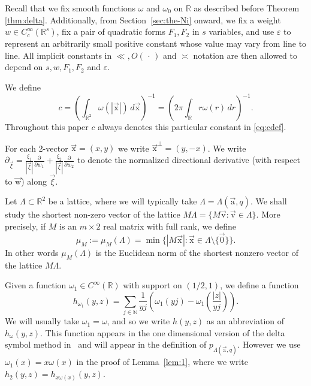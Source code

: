 \documentclass[letterpaper,11pt]{amsart}
\numberwithin{equation}{section}
\theoremstyle{definition}
\numberwithin{equation}{section}
\newcommand{\RR}{\mathbb{R}}
\newcommand{\ux}{{\vec{\mathrm{x}}}}
\newcommand{\ua}{\vec{\mathrm{a}}}
\newcommand{\uw}{{\vec{\mathrm{w}}}}
\newcommand{\uv}{{\vec{\mathrm{v}}}}
\newcommand{\ve}{\varepsilon}
\newcommand{\N}{\mathbb{N}}
\newcommand{\R}{\mathbb{R}}
\begin{document}
Recall that we fix smooth functions $\omega$ and $\omega_0$ on $\RR$ as described before Theorem \ref{thm:delta}.
 Additionally, from Section~\ref{sec:the-Ni} onward, we fix a weight \(w\in C_c^\infty(\mathbb R^s)\), fix a pair of quadratic forms \(F_1,F_2\) in \(s\) variables, and use \(\ve\) to represent an arbitrarily small positive constant whose value may vary from line to line. All implicit constants in \(\ll, O(\,\cdot\,)\) and \(\asymp\) notation are then allowed to depend on \(s,w,F_1,F_2\) and \(\ve\).   


We define
 \begin{equation}
 	\label{eq:cdef}
 	c = (\int_{\R^2} \omega(|\ux|)\,d\ux)^{-1}=(2\pi\int_\R r\omega(r)\,dr)^{-1}.
 \end{equation}
Throughout this paper \(c\) always denotes this particular constant in \eqref{eq:cdef}.


 For each 2-vector \(\ux=(x,y)\) we write \(\ux^\perp = (y,-x)\). We write \(\partial_{\vec{\xi}} = \frac{\xi_1}{|\vec\xi|}\frac{\partial}{\partial w_1}+ \frac{\xi_2}{|\vec\xi|}\frac{\partial}{\partial w_2}\) to denote the normalized directional derivative (with respect to $\uw$) along \(\vec{\xi}\).

 
 Let $\Lambda\subset \RR^2$ be a lattice, where  we  will   typically take \(\Lambda=\Lambda(\ua,q)\). We shall study the shortest non-zero vector of the lattice \(M\Lambda=\{M\uv:\uv\in \Lambda\}\). More precisely, if \(M\) is an \(m \times 2\) real matrix with full rank, we define
 \begin{equation*}
 	\mu_{M}:=\mu_M(\Lambda)=\min\{|M\ux|:\ux\in \Lambda\setminus\{\vec{0}\}\}.
 \end{equation*}
 In other words \(\mu_M(\Lambda)\) is the Euclidean norm of the shortest nonzero vector of the lattice \(M\Lambda\).
 

Given a function \(\omega_1\in C^\infty (\RR)\) with support on $(1/2,1)$, we define a function
\begin{equation}
	\label{eq:hyzdef}
	h_{\omega_1}(y,z)
	=
	\sum_{j\in\N}
	\frac{1}{yj}\left(\omega_1(yj)-\omega_1\left(\frac{|z|}{yj}\right)\right).
\end{equation}
We will usually take $\omega_1=\omega$, and so we write $h(y,z)$ as an abbreviation of $h_{\omega}(y,z)$. This function
appears in the one dimensional version of the delta symbol method in~\cite{Heath-Brown96} and will appear in the definition of $p_{\Lambda(\ua, q)}$. 
However we use $\omega_1(x)=x\omega(x)$ in the proof of Lemma~\ref{lem:1}, where we write $h_{2}(y,z)=h_{x\omega(x)}(y,z)$. 
\end{document}
